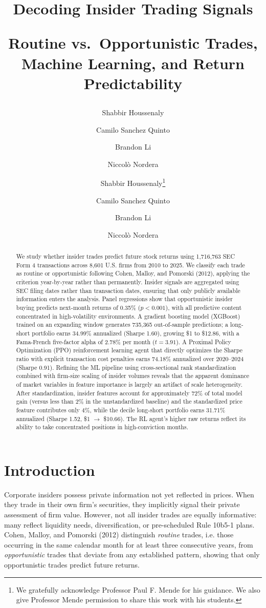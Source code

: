 \documentclass{article}
\title{\textbf{Decoding Insider Trading Signals}\\
\bigskip 

\large \textbf{Routine vs.\ Opportunistic Trades, Machine Learning, and Return Predictability}}
\author{Shabbir Houssenaly \and Camilo Sanchez Quinto \and Brandon Li \and Niccol\`o Nordera}\author{Shabbir Houssenaly\thanks{We gratefully acknowledge Professor Paul F. Mende for his guidance. We also give Professor Mende permission to share this work with his students.} \and Camilo Sanchez Quinto\footnotemark[1] \and Brandon Li\footnotemark[1] \and Niccol\`o Nordera\footnotemark[1]}
\begin{document}
\maketitle

\begin{abstract}
\noindent We study whether insider trades predict future stock returns using 1,716,763 SEC Form 4 transactions across 8,601 U.S. firms from 2010 to 2025. We classify each trade as routine or opportunistic following Cohen, Malloy, and Pomorski (2012), applying the criterion year-by-year rather than permanently. Insider signals are aggregated using SEC filing dates rather than transaction dates, ensuring that only publicly available information enters the analysis. Panel regressions show that opportunistic insider buying predicts next-month returns of 0.35\% ($p < 0.001$), with all predictive content concentrated in high-volatility environments. A gradient boosting model (XGBoost) trained on an expanding window generates 735,365 out-of-sample predictions; a long-short portfolio earns 34.99\% annualized (Sharpe 1.60), growing \$1 to \$12.86, with a Fama-French five-factor alpha of 2.78\% per month ($t = 3.91$). A Proximal Policy Optimization (PPO) reinforcement learning agent that directly optimizes the Sharpe ratio with explicit transaction cost penalties earns 74.18\% annualized over 2020--2024 (Sharpe 0.91). Refining the ML pipeline using cross-sectional rank standardization combined with firm-size scaling of insider volumes reveals that the apparent dominance of market variables in feature importance is largely an artifact of scale heterogeneity. After standardization, insider features account for approximately 72\% of total model gain (versus less than 2\% in the unstandardized baseline) and the standardized price feature contributes only 4\%, while the decile long-short portfolio earns 31.71\% annualized (Sharpe 1.52, \$1 $\to$ \$10.66). The RL agent's higher raw returns reflect its ability to take concentrated positions in high-conviction months.
\end{abstract}

\section{Introduction}

Corporate insiders possess private information not yet reflected in prices. When they trade in their own firm's securities, they implicitly signal their private assessment of firm value. However, not all insider trades are equally informative: many reflect liquidity needs, diversification, or pre-scheduled Rule 10b5-1 plans. Cohen, Malloy, and Pomorski (2012) distinguish \textit{routine} trades, i.e. those occurring in the same calendar month for at least three consecutive years,  from \textit{opportunistic} trades that deviate from any established pattern, showing that only opportunistic trades predict future returns.
\end{document}
